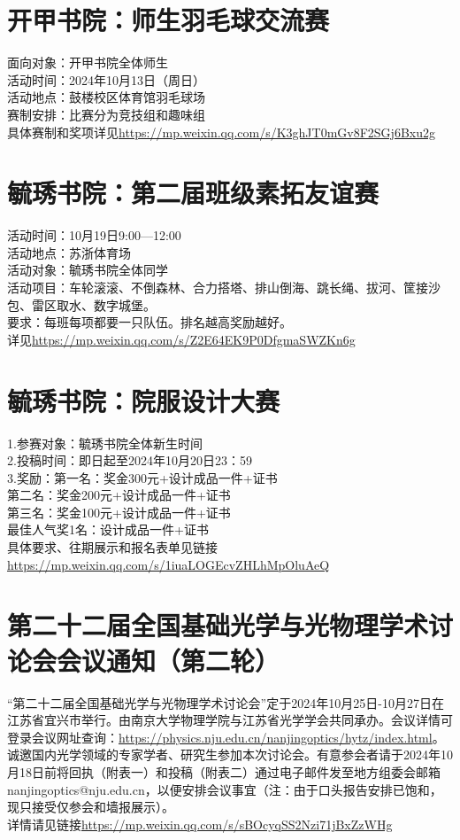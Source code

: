 \documentclass[letterpaper, 12pt]{article}
\begin{document}
\begin{multicols}{2}
\section{开甲书院：师生羽毛球交流赛}
面向对象：开甲书院全体师生\\
活动时间：2024年10月13日（周日）\\
活动地点：鼓楼校区体育馆羽毛球场\\
赛制安排：比赛分为竞技组和趣味组\\
具体赛制和奖项详见\url{https://mp.weixin.qq.com/s/K3ghJT0mGv8F2SGj6Bxu2g}
\section{毓琇书院：第二届班级素拓友谊赛}
活动时间：10月19日9:00—12:00\\
活动地点：苏浙体育场\\
活动对象：毓琇书院全体同学\\
活动项目：车轮滚滚、不倒森林、合力搭塔、排山倒海、跳长绳、拔河、筐接沙包、雷区取水、数字城堡。\\
要求：每班每项都要一只队伍。排名越高奖励越好。\\
详见\url{https://mp.weixin.qq.com/s/Z2E64EK9P0DfgmaSWZKn6g}
\section{毓琇书院：院服设计大赛}
1.参赛对象：毓琇书院全体新生时间\\
2.投稿时间：即日起至2024年10月20日23：59\\
3.奖励：第一名：奖金300元+设计成品一件+证书\\
第二名：奖金200元+设计成品一件+证书\\
第三名：奖金100元+设计成品一件+证书\\
最佳人气奖1名：设计成品一件+证书\\
具体要求、往期展示和报名表单见链接\url{https://mp.weixin.qq.com/s/1iuaLOGEcvZHLhMpOluAeQ}
\section{第二十二届全国基础光学与光物理学术讨论会会议通知（第二轮）}
“第二十二届全国基础光学与光物理学术讨论会”定于2024年10月25日-10月27日在江苏省宜兴市举行。由南京大学物理学院与江苏省光学学会共同承办。会议详情可登录会议网址查询：\url{https://physics.nju.edu.cn/nanjingoptics/hytz/index.html}。\\
诚邀国内光学领域的专家学者、研究生参加本次讨论会。有意参会者请于2024年10月18日前将回执（附表一）和投稿（附表二）通过电子邮件发至地方组委会邮箱nanjingoptics@nju.edu.cn，以便安排会议事宜（注：由于口头报告安排已饱和，现只接受仅参会和墙报展示）。\\
详情请见链接\url{https://mp.weixin.qq.com/s/sBOcyqSS2Nzi71jBxZzWHg}


\end{multicols}
\end{document}
